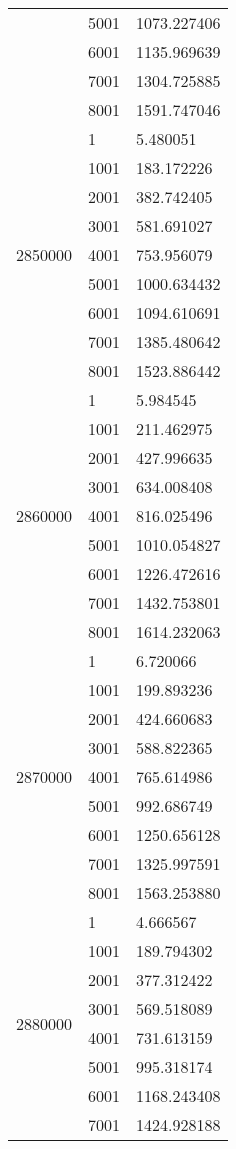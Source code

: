 \begin{table}[htb!]
\begin{tabular}{lll}
 & 5001 & 1073.227406 \\
 & 6001 & 1135.969639 \\
 & 7001 & 1304.725885 \\
 & 8001 & 1591.747046 \\
\multirow[c]{9}{*}{2850000} & 1 & 5.480051 \\
 & 1001 & 183.172226 \\
 & 2001 & 382.742405 \\
 & 3001 & 581.691027 \\
 & 4001 & 753.956079 \\
 & 5001 & 1000.634432 \\
 & 6001 & 1094.610691 \\
 & 7001 & 1385.480642 \\
 & 8001 & 1523.886442 \\
\multirow[c]{9}{*}{2860000} & 1 & 5.984545 \\
 & 1001 & 211.462975 \\
 & 2001 & 427.996635 \\
 & 3001 & 634.008408 \\
 & 4001 & 816.025496 \\
 & 5001 & 1010.054827 \\
 & 6001 & 1226.472616 \\
 & 7001 & 1432.753801 \\
 & 8001 & 1614.232063 \\
\multirow[c]{9}{*}{2870000} & 1 & 6.720066 \\
 & 1001 & 199.893236 \\
 & 2001 & 424.660683 \\
 & 3001 & 588.822365 \\
 & 4001 & 765.614986 \\
 & 5001 & 992.686749 \\
 & 6001 & 1250.656128 \\
 & 7001 & 1325.997591 \\
 & 8001 & 1563.253880 \\
\multirow[c]{9}{*}{2880000} & 1 & 4.666567 \\
 & 1001 & 189.794302 \\
 & 2001 & 377.312422 \\
 & 3001 & 569.518089 \\
 & 4001 & 731.613159 \\
 & 5001 & 995.318174 \\
 & 6001 & 1168.243408 \\
 & 7001 & 1424.928188 \\

\end{tabular}
\end{table}
